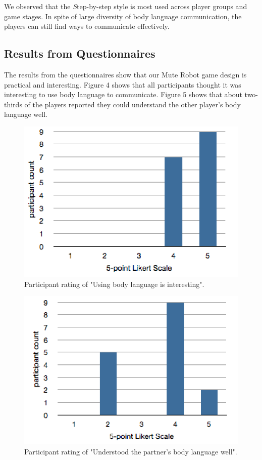 \documentclass{chi-ext}
\begin{document}
We observed that the {\emph Step-by-step style} is most used across player groups and game stages. 
In spite of large diversity of body language communication, the players can still find ways to communicate effectively.


%
\subsection{Results from Questionnaires}

The results from the questionnaires show that our Mute Robot game design is practical and interesting. 
Figure 4 shows that all participants thought it was interesting to use body language to communicate.
Figure 5 shows that about two-thirds of the players reported they could understand the other player's body language well.

\begin{figure}
  \centering
  \includegraphics[width=0.65\linewidth]{figures/1_BLisInteresting.png}
  \caption{Participant rating of "Using body language is interesting".}
  \label{fig:1_BLisInteresting}
\end{figure}


\begin{figure}
  \centering
  \includegraphics[width=0.65\linewidth]{figures/2_BLunderstand.png}
  \caption{Participant rating of "Understood the partner's body language well".}
  \label{fig:2_BLunderstand}
\end{figure}
\end{document}
